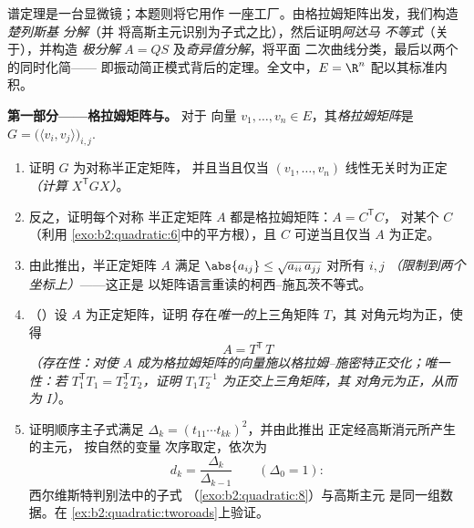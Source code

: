 \begin{problem}\label{pb:b2:quadratic:1}
谱定理是一台显微镜；本题则将它用作
一座工厂。由格拉姆矩阵出发，我们构造\emph{楚列斯基
分解}（并
将高斯主元识别为子式之比），然后证明\emph{阿达马
不等式}（关于），并构造
\emph{极分解} $A =
QS$ 及\emph{奇异值分解}，将平面
二次曲线分类，最后以两个的同时化简——
即振动简正模式背后的定理。全文中，$E =
\R^n$ 配以其标准内积。

\medskip
\noindent\textbf{第一部分——格拉姆矩阵与。} 对于
向量 $v_1, \dots, v_n \in E$，其\emph{格拉姆矩阵}是
$G = \bigl(\langle v_i, v_j\rangle\bigr)_{i,j}$.
\begin{enumerate}
  \item 证明 $G$ 为对称半正定矩阵，
        并且当且仅当 $(v_1, \dots, v_n)$
        线性无关时为正定 \emph{（计算 $X^{\mathsf T}GX$）}。
  \item 反之，证明每个对称
        半正定矩阵 $A$ 都是格拉姆矩阵：$A = C^{\mathsf T}C$，
        对某个 $C$（利用
        \cref{exo:b2:quadratic:6}中的平方根），且 $C$ 可逆当且仅当 $A$
        为正定。
  \item 由此推出，半正定矩阵 $A$ 满足
        $\abs{a_{ij}} \leq \sqrt{a_{ii}\,a_{jj}}$ 对所有 $i,
        j$ \emph{（限制到两个坐标上）}——这正是
        以矩阵语言重读的柯西–施瓦茨不等式。
  \item （）设 $A$ 为正定矩阵，证明
        存在\emph{唯一的}上三角矩阵 $T$，其
        对角元均为正，使得
        \[
        A = T^{\mathsf T}\,T
        \]
        \emph{（存在性：对使
        $A$ 成为格拉姆矩阵的向量施以格拉姆–施密特正交化；唯一性：若
        $T_1^{\mathsf T}T_1 = T_2^{\mathsf T}T_2$，证明
        $T_1T_2^{-1}$ 为正交上三角矩阵，其
        对角元为正，从而为 $I$）}。
  \item 证明顺序主子式满足
        $\Delta_k = (t_{11}\cdots t_{kk})^2$，并由此推出
        正定经高斯消元所产生的主元，
        按自然的变量
        次序取定，依次为
        \[
        d_k = \frac{\Delta_k}{\Delta_{k-1}}
        \qquad (\Delta_0 = 1) :
        \]
        西尔维斯特判别法中的子式
        （\cref{exo:b2:quadratic:8}）与高斯主元
        是同一组数据。在
        \cref{ex:b2:quadratic:tworoads}上验证。
\end{enumerate}


\end{problem}
